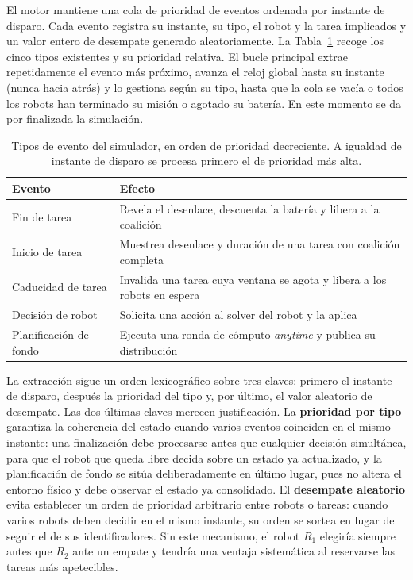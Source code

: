 El motor mantiene una cola de prioridad de eventos ordenada por instante de disparo. Cada evento registra su instante, su tipo, el robot y la tarea implicados y un valor entero de desempate generado aleatoriamente. La Tabla~\ref{tab:eventos} recoge los cinco tipos existentes y su prioridad relativa. El bucle principal extrae repetidamente el evento más próximo, avanza el reloj global hasta su instante (nunca hacia atrás) y lo gestiona según su tipo, hasta que la cola se vacía o todos los robots han terminado su misión o agotado su batería. En este momento se da por finalizada la simulación.

\begin{table}[t]
\centering
\caption{Tipos de evento del simulador, en orden de prioridad decreciente. A igualdad de instante de disparo se procesa primero el de prioridad más alta.}
\label{tab:eventos}
\begin{tabular}{ll}
\hline
\textbf{Evento} & \textbf{Efecto} \\
\hline
Fin de tarea        & Revela el desenlace, descuenta la batería y libera a la coalición \\
Inicio de tarea     & Muestrea desenlace y duración de una tarea con coalición completa \\
Caducidad de tarea  & Invalida una tarea cuya ventana se agota y libera a los robots en espera \\
Decisión de robot   & Solicita una acción al solver del robot y la aplica \\
Planificación de fondo & Ejecuta una ronda de cómputo \textit{anytime} y publica su distribución \\
\hline
\end{tabular}
\end{table}

La extracción sigue un orden lexicográfico sobre tres claves: primero el instante de disparo, después la prioridad del tipo y, por último, el valor aleatorio de desempate. Las dos últimas claves merecen justificación. La \textbf{prioridad por tipo} garantiza la coherencia del estado cuando varios eventos coinciden en el mismo instante: una finalización debe procesarse antes que cualquier decisión simultánea, para que el robot que queda libre decida sobre un estado ya actualizado, y la planificación de fondo se sitúa deliberadamente en último lugar, pues no altera el entorno físico y debe observar el estado ya consolidado. El \textbf{desempate aleatorio} evita establecer un orden de prioridad arbitrario entre robots o tareas: cuando varios robots deben decidir en el mismo instante, su orden se sortea en lugar de seguir el de sus identificadores. Sin este mecanismo, el robot $R_1$ elegiría siempre antes que $R_2$ ante un empate y tendría una ventaja sistemática al reservarse las tareas más apetecibles.

